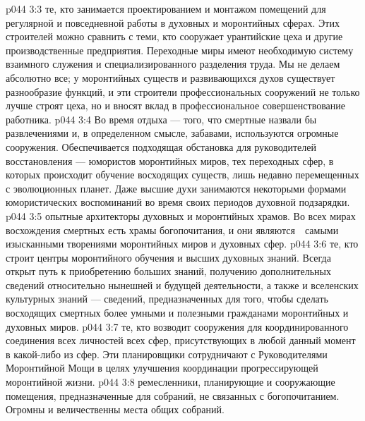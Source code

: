 \vs p044 3:3 \bibnobreakspace {} те, кто занимается проектированием и монтажом помещений для регулярной и повседневной работы в духовных и моронтийных сферах. Этих строителей можно сравнить с теми, кто сооружает урантийские цеха и другие производственные предприятия. Переходные миры имеют необходимую систему взаимного служения и специализированного разделения труда. Мы не делаем абсолютно все; у моронтийных существ и развивающихся духов существует разнообразие функций, и эти строители профессиональных сооружений не только лучше строят цеха, но и вносят вклад в профессиональное совершенствование работника.
\vs p044 3:4 \bibnobreakspace {} Во время отдыха --- того, что смертные назвали бы развлечениями и, в определенном смысле, забавами, используются огромные сооружения. Обеспечивается подходящая обстановка для руководителей восстановления --- юмористов моронтийных миров, тех переходных сфер, в которых происходит обучение восходящих существ, лишь недавно перемещенных с эволюционных планет. Даже высшие духи занимаются некоторыми формами юмористических воспоминаний во время своих периодов духовной подзарядки.
\vs p044 3:5 \bibnobreakspace {} опытные архитекторы духовных и моронтийных храмов. Во всех мирах восхождения смертных есть храмы богопочитания, и они являются　самыми изысканными творениями моронтийных миров и духовных сфер.
\vs p044 3:6 \bibnobreakspace {} те, кто строит центры моронтийного обучения и высших духовных знаний. Всегда открыт путь к приобретению больших знаний, получению дополнительных сведений относительно нынешней и будущей деятельности, а также и вселенских культурных знаний --- сведений, предназначенных для того, чтобы сделать восходящих смертных более умными и полезными гражданами моронтийных и духовных миров.
\vs p044 3:7 \bibnobreakspace {} те, кто возводит сооружения для координированного соединения всех личностей всех сфер, присутствующих в любой данный момент в какой\hyp{}либо из сфер. Эти планировщики сотрудничают с Руководителями Моронтийной Мощи в целях улучшения координации прогрессирующей моронтийной жизни.
\vs p044 3:8 \bibnobreakspace {} ремесленники, планирующие и сооружающие помещения, предназначенные для собраний, не связанных с богопочитанием. Огромны и величественны места общих собраний.
